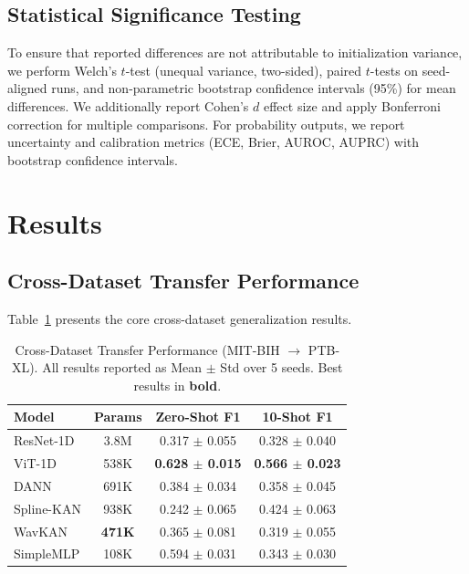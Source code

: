 \documentclass[journal,twoside,web]{ieeecolor}
\begin{document}
\subsection{Statistical Significance Testing}
To ensure that reported differences are not attributable to initialization variance, we perform Welch's $t$-test (unequal variance, two-sided), paired $t$-tests on seed-aligned runs, and non-parametric bootstrap confidence intervals (95\%) for mean differences. We additionally report Cohen's $d$ effect size and apply Bonferroni correction for multiple comparisons. For probability outputs, we report uncertainty and calibration metrics (ECE, Brier, AUROC, AUPRC) with bootstrap confidence intervals.

\section{Results}



\subsection{Cross-Dataset Transfer Performance}

Table~\ref{tab:main_results} presents the core cross-dataset generalization results.

\begin{table}[!t]
\centering
\caption{Cross-Dataset Transfer Performance (MIT-BIH $\to$ PTB-XL). All results reported as Mean $\pm$ Std over 5 seeds. Best results in \textbf{bold}.}
\label{tab:main_results}
\begin{tabular}{@{}lccc@{}}
\toprule
\textbf{Model} & \textbf{Params} & \textbf{Zero-Shot F1} & \textbf{10-Shot F1} \\
\midrule
ResNet-1D      & 3.8M   & 0.317 $\pm$ 0.055 & 0.328 $\pm$ 0.040 \\
ViT-1D         & 538K   & \textbf{0.628 $\pm$ 0.015} & \textbf{0.566 $\pm$ 0.023} \\
DANN           & 691K   & 0.384 $\pm$ 0.034 & 0.358 $\pm$ 0.045 \\
Spline-KAN     & 938K   & 0.242 $\pm$ 0.065 & 0.424 $\pm$ 0.063 \\
WavKAN         & \textbf{471K} & 0.365 $\pm$ 0.081 & 0.319 $\pm$ 0.055 \\
SimpleMLP      & 108K   & 0.594 $\pm$ 0.031 & 0.343 $\pm$ 0.030 \\
\bottomrule
\end{tabular}
\end{table}
\end{document}

